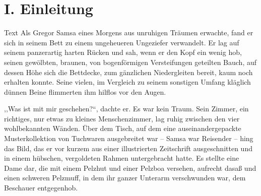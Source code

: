\documentclass[prepress]{zchinr}
\begin{document}

\printtitle

\printissuetoc



\printtitle

\section{I. Einleitung}

Text Als Gregor Samsa eines Morgens aus unruhigen Träumen erwachte, fand er sich in seinem Bett zu einem ungeheueren Ungeziefer verwandelt. Er lag auf seinem panzerartig harten Rücken und sah, wenn er den Kopf ein wenig hob, seinen gewölbten, braunen, von bogenförmigen Versteifungen geteilten Bauch, auf dessen Höhe sich die Bettdecke, zum gänzlichen Niedergleiten bereit, kaum noch erhalten konnte. Seine vielen, im Vergleich zu seinem sonstigen Umfang kläglich dünnen Beine flimmerten ihm hilflos vor den Augen.

,,Was ist mit mir geschehen?{}``, dachte er. Es war kein Traum. Sein Zimmer, ein richtiges, nur etwas zu kleines Menschenzimmer, lag ruhig zwischen den vier wohlbekannten Wänden. Über dem Tisch, auf dem eine auseinandergepackte Musterkollektion von Tuchwaren ausgebreitet war -- Samsa war Reisender -- hing das Bild, das er vor kurzem aus einer illustrierten Zeitschrift ausgeschnitten und in einem hübschen, vergoldeten Rahmen untergebracht hatte. Es stellte eine Dame dar, die mit einem Pelzhut und einer Pelzboa versehen, aufrecht dasaß und einen schweren Pelzmuff, in dem ihr ganzer Unterarm verschwunden war, dem Beschauer entgegenhob.
\end{document}

